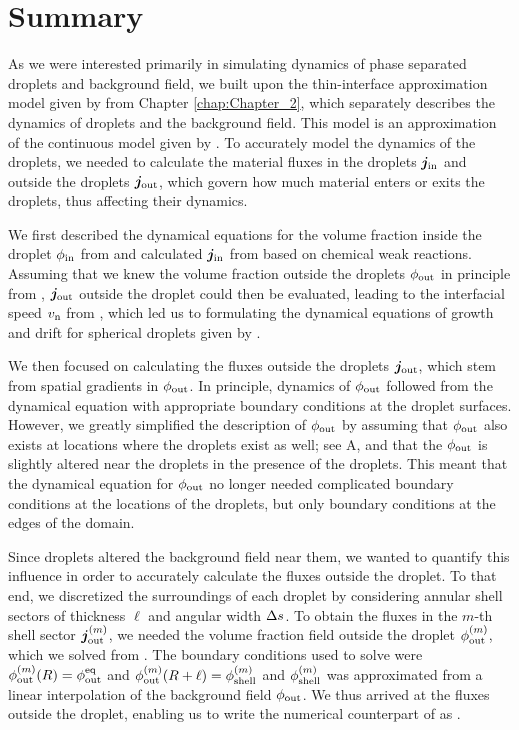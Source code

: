 \section{Summary}

As we were interested primarily in simulating dynamics of phase separated droplets and background field, we built upon the thin-interface approximation model given by  from Chapter \ref{chap:Chapter_2}, which separately describes the dynamics of droplets and the background field.
This model is an approximation of the continuous model given by .
To accurately model the dynamics of the droplets, we needed to calculate the material fluxes in the droplets $\boldsymbol{j}_\mathrm{in}$ and outside the droplets $\boldsymbol{j}_\mathrm{out}$, which govern how much material enters or exits the droplets, thus affecting their dynamics.

We first described the dynamical equations for the volume fraction inside the droplet $\phi_\mathrm{in}$ from  and calculated $\boldsymbol{j}_\mathrm{in}$ from  based on chemical weak reactions.
Assuming that we knew the volume fraction outside the droplets $\phi_\mathrm{out}$ in principle from , $\boldsymbol{j}_\mathrm{out}$ outside the droplet could then be evaluated, leading to the interfacial speed $v_\mathrm{n}$ from , which led us to formulating the dynamical equations of growth and drift for spherical droplets given by .

We then focused on calculating the fluxes outside the droplets $\boldsymbol{j}_\mathrm{out}$, which stem from spatial gradients in $\phi_\mathrm{out}$.
In principle, dynamics of $\phi_\mathrm{out}$ followed from the dynamical equation  with appropriate boundary conditions at the droplet surfaces.
However, we greatly simplified the description of $\phi_\mathrm{out}$ by assuming that $\phi_\mathrm{out}$ also exists at locations where the droplets exist as well; see A, and that the $\phi_\mathrm{out}$ is slightly altered near the droplets in the presence of the droplets. 
This meant that the dynamical equation for $\phi_\mathrm{out}$  no longer needed complicated boundary conditions at the locations of the droplets, but only boundary conditions at the edges of the domain. 

Since droplets altered the background field near them, we wanted to quantify this influence in order to accurately calculate the fluxes outside the droplet.
To that end, we discretized the surroundings of each droplet by considering annular shell sectors of thickness $\ell$ and angular width $\Delta s$.
To obtain the fluxes in the $m$-th shell sector $\boldsymbol{j}_\mathrm{out}^{(m)}$, we needed the volume fraction field outside the droplet $\phi_\mathrm{out}^{(m)}$, which we solved from .
The boundary conditions used to solve  were $\phi_\mathrm{out}^{(m)}(R)=\phi^\mathrm{eq}_\mathrm{out}$ and $\phi_\mathrm{out}^{(m)}(R + \ell)= \phi_\mathrm{shell}^{(m)}$ and $\phi_\mathrm{shell}^{(m)}$ was approximated from a linear interpolation of the background field $\phi_\mathrm{out}$.
We thus arrived at the fluxes outside the droplet, enabling us to write the numerical counterpart of  as .

